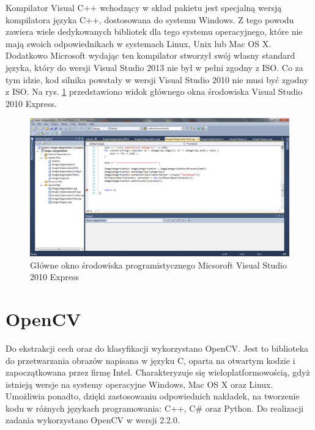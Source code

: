 Kompilator Visual C++ wchodzący w skład pakietu jest specjalną wersją kompilatora języka C++, dostosowana do systemu Windows. Z tego powodu zawiera wiele dedykowanych bibliotek dla tego systemu operacyjnego, które nie mają swoich odpowiednikach w systemach Linux, Unix lub Mac OS X. Dodatkowo Microsoft wydając ten kompilator stworzył swój własny standard języka, który do wersji Visual Studio 2013 nie był w pełni zgodny z ISO. Co za tym idzie, kod silnika powstały w wersji Visual Studio 2010 nie musi być zgodny z ISO. Na rys. \ref{fig:visual-studio-main-window} przedstawiono widok głównego okna środowiska Visual Studio 2010 Express.

\begin{figure}[h]
	\centering
	\includegraphics[scale=0.4]{graphics/03_implementacja/visual-studio-main-window.pdf}
	\caption{ Główne okno środowiska programistycznego Micsoroft Visual Studio 2010 Express }
	\label{fig:visual-studio-main-window}
\end{figure}

\section{OpenCV}

Do ekstrakcji cech oraz do klasyfikacji wykorzystano OpenCV. Jest to biblioteka do przetwarzania obrazów napisana w języku C, oparta na otwartym kodzie i zapoczątkowana przez firmę Intel. Charakteryzuje się wieloplatformowością, gdyż istnieją wersje na systemy operacyjne Windows, Mac OS X oraz Linux. Umożliwia ponadto, dzięki zastosowaniu odpowiednich nakładek, na tworzenie kodu w różnych językach programowania: C++, C\# oraz Python. Do realizacji zadania wykorzystano OpenCV w wersji 2.2.0.

